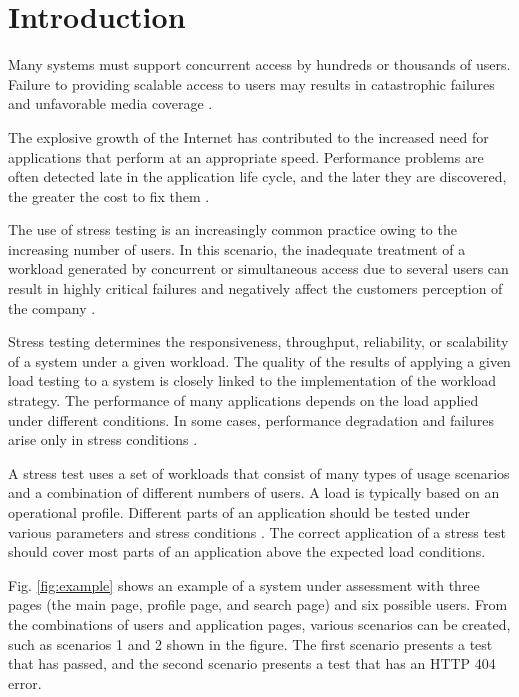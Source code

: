\chapter{Introduction}

Many systems must support concurrent access by hundreds or thousands of users. Failure to providing scalable access to users may results in catastrophic failures and unfavorable media coverage \cite{Jiang2010}. 

The explosive growth of the Internet has contributed to the increased need for applications that perform at an appropriate speed. Performance problems are often detected late in the application life cycle, and the later they are discovered, the greater the cost to fix them \cite{Molyneaux2009}.

The use of stress testing is an increasingly common practice owing to the increasing number of users. In this scenario, the inadequate treatment of a workload generated by concurrent or simultaneous access due to several users can result in highly critical failures and negatively affect the customers perception of the company \cite{Draheim2006b} \cite{Jiang2010}. 

Stress testing determines the responsiveness, throughput, reliability, or scalability of a system under a given workload. The quality of the results of applying a given load testing to a system is closely linked to the implementation of the workload strategy. The performance of many applications depends on the load applied under different conditions. In some cases, performance degradation and failures arise only in stress conditions \cite{Garousi2010} \cite{Jiang2010}.


A stress test uses a set of workloads that consist of many types of usage scenarios and a combination of different numbers of users. A load is typically based on an operational profile. Different parts of an application should be tested under various parameters and stress conditions \cite{Babbar2011}. The correct application of a stress test should cover most parts of an application above the expected load conditions\cite{Draheim2006b}.


Fig. \ref{fig:example} shows an example of a system under assessment with three pages (the main page, profile page, and search page) and six possible users. From the combinations of users and application pages, various scenarios can be created, such as scenarios 1 and 2 shown in the figure. The first scenario presents a test that has passed, and the second scenario presents a test that has an HTTP 404 error.

